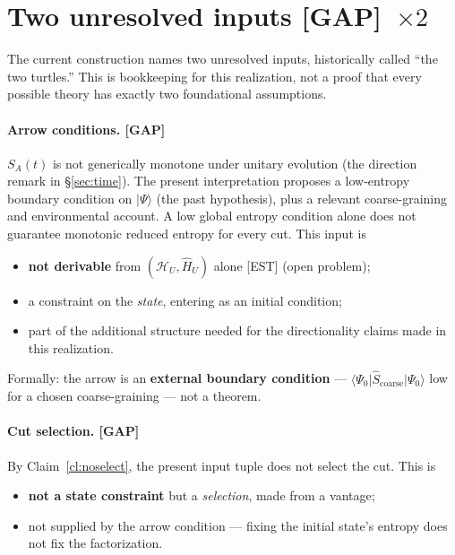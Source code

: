 \documentclass[11pt]{article}
\newcommand{\est}{\textcolor{teal!70!black}{\textsf{\small[EST]}}}
\newcommand{\fields}{\textcolor{violet}{\textsf{\small[FIELDS]}}}
\newcommand{\asm}{\textcolor{blue!70!black}{\textsf{\small[ASM]}}}
\newcommand{\gap}{\textcolor{red!75!black}{\textsf{\small[GAP]}}}
\def\est{[EST]}\def\fields{[FIELDS]}\def\asm{[ASM]}%
\def\quad{ }\def\normalsize{}%
\theoremstyle{definition}
\theoremstyle{remark}
\begin{document}
\section{Two unresolved inputs \quad{\normalsize\texorpdfstring{\gap\ $\times 2$}{[GAP] x 2}}\label{sec:turtles}}

The current construction names two unresolved inputs, historically called ``the two turtles.'' This is bookkeeping for this realization, not a proof that every possible theory has exactly two foundational assumptions.

\paragraph{Arrow conditions. \gap}
$S_A(t)$ is not generically monotone under unitary evolution (the direction remark in \S\ref{sec:time}). The present interpretation proposes a low-entropy boundary condition on $\lvert\Psi\rangle$ (the past hypothesis), plus a relevant coarse-graining and environmental account. A low global entropy condition alone does not guarantee monotonic reduced entropy for every cut. This input is
\begin{itemize}[leftmargin=1.4em, itemsep=1pt, topsep=2pt]
  \item \textbf{not derivable} from $(\mathcal{H}_U, \hat{H}_U)$ alone \est{} (open problem);
  \item a constraint on the \emph{state}, entering as an initial condition;
  \item part of the additional structure needed for the directionality claims made in this realization.
\end{itemize}
Formally: the arrow is an \textbf{external boundary condition} --- $\langle\Psi_0\vert \hat{S}_{\text{coarse}}\vert\Psi_0\rangle$ low for a chosen coarse-graining --- not a theorem.

\paragraph{Cut selection. \gap}
By Claim~\ref{cl:noselect}, the present input tuple does not select the cut. This is
\begin{itemize}[leftmargin=1.4em, itemsep=1pt, topsep=2pt]
  \item \textbf{not a state constraint} but a \emph{selection}, made from a vantage;
  \item not supplied by the arrow condition --- fixing the initial state's entropy does not fix the factorization.
\end{itemize}
\end{document}
